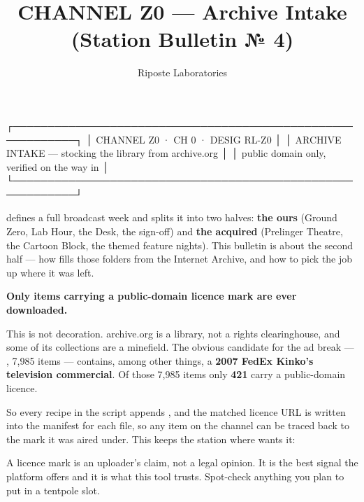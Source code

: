\documentclass[fontpath=fonts/,logopath=logo/]{riposte-doc}
\title{CHANNEL Z0 — Archive Intake (Station Bulletin № 4)}
\author{Riposte Laboratories}
\date{}
\begin{document}
\ripmakehead

\riptoc

\ripcodeopen
{}
\begin{ripcodeblock}
┌───────────────────────────────────────────────────────────┐
│   CHANNEL Z0 · CH 0 · DESIG RL-Z0                         │
│   ARCHIVE INTAKE — stocking the library from archive.org  │
│   public domain only, verified on the way in              │
└───────────────────────────────────────────────────────────┘
\end{ripcodeblock}
\ripcodesizereset\ripcodeclose

 defines a full broadcast week and splits it into two halves: \textbf{the ours} (Ground Zero, Lab Hour, the Desk, the sign-off) and \textbf{the acquired} (Prelinger Theatre, the Cartoon Block, the themed feature nights). This bulletin is about the second half — how  fills those folders from the Internet Archive, and how to pick the job up where it was left.



\textbf{Only items carrying a public-domain licence mark are ever downloaded.}

This is not decoration. archive.org is a library, not a rights clearinghouse, and some of its collections are a minefield. The obvious candidate for the ad break — , 7,985 items — contains, among other things, a \textbf{2007 FedEx Kinko's television commercial}. Of those 7,985 items only \textbf{421} carry a public-domain licence.

So every recipe in the script appends , and the matched licence URL is written into the manifest for each file, so any item on the channel can be traced back to the mark it was aired under. This keeps the station where  wants it: 

A licence mark is an uploader's claim, not a legal opinion. It is the best signal the platform offers and it is what this tool trusts. Spot-check anything you plan to put in a tentpole slot.


\end{document}
